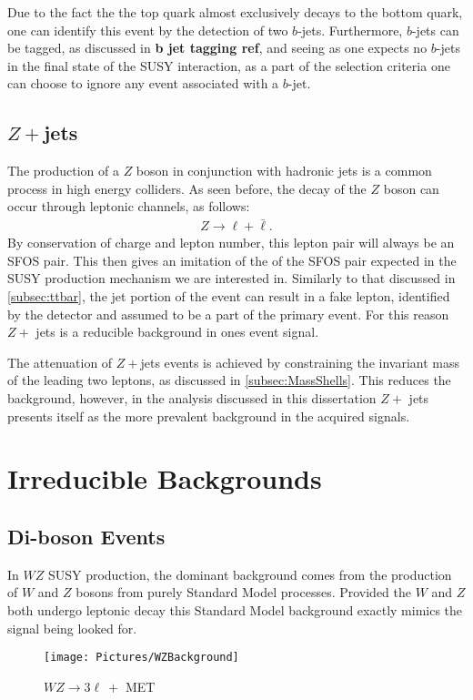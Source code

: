 Due to the fact the the top quark almost exclusively decays to the bottom quark, one can identify this event by the detection of two $b$-jets. 
Furthermore, $b$-jets can be tagged, as discussed in \textbf{\large b jet tagging ref}, and seeing as one expects no $b$-jets in the final state of the SUSY interaction, as a part of the selection criteria one can choose to ignore any event associated with a $b$-jet.

\subsection{$Z+$jets}
The production of a $Z$ boson in conjunction with hadronic jets is a common process in high energy colliders. 
As seen before, the decay of the $Z$ boson can occur through leptonic channels, as follows: 
\begin{align}
Z \rightarrow \ell + \bar{\ell}.
\end{align}
By conservation of charge and lepton number, this lepton pair will always be an SFOS pair. 
This then gives an imitation of the of the SFOS pair expected in the SUSY production mechanism we are interested in.
Similarly to that discussed in \ref{subsec:ttbar}, the jet portion of the event can result in a fake lepton, identified by the detector and assumed to be a part of the primary event.
For this reason $Z +$ jets is a reducible background in ones event signal.

The attenuation of $Z+$jets events is achieved by constraining the invariant mass of the leading two leptons, as discussed in \ref{subsec:MassShells}.
This reduces the background, however, in the analysis discussed in this dissertation $Z+$ jets presents itself as the more prevalent background in the acquired signals. 

\section{Irreducible Backgrounds}
\subsection{Di-boson Events}
In $WZ$ SUSY production, the dominant background comes from the production of $W$ and $Z$ bosons from purely Standard Model processes.
Provided the $W$ and $Z$ both undergo leptonic decay this Standard Model background exactly mimics the signal being looked for.

\begin{figure}[H] %
   \centering
   \texttt{[image: Pictures/WZBackground]} 
   \caption{$WZ \rightarrow 3\ell\ +$ MET}
   \label{fig:example}
\end{figure}


